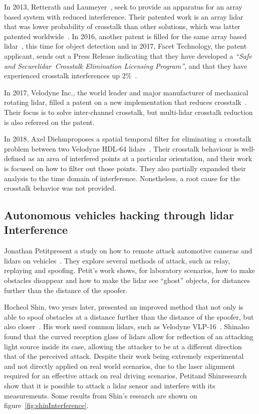 In 2013, Retterath and Laumeyer~\cite{Retterath2015}, seek to provide an apparatus for an array based system with reduced interference. Their patented work is an array \ac{lidar} that was lower probability of crosstalk than other solutions, which was latter patented worldwide~\cite{Retterath2015WO}. In 2016, another patent is filled for the same array based \ac{lidar}~\cite{Retterath2016}, this time for object detection and in 2017, Facet Technology, the patent applicant, sends out a Press Release indicating that they have developed a \textit{``Safe and Secure\acs{lidar}\cp~Crosstalk Elimination Licensing Program''}, and that they have experienced crosstalk interferences up 2\%~\cite{Facet}.

In 2017, Velodyne Inc., the world leader and  major manufacturer of mechanical rotating \ac{lidar}, filled a patent on a new implementation that reduces crosstalk~\cite{Hall2017}. Their focus is to solve inter-channel crosstalk, but multi-\ac{lidar} crosstalk reduction is also referred on the patent.

In 2018, Axel Diehm\etal proposes a spatial temporal filter for eliminating a crosstalk problem between two Velodyne HDL-64 \acp{lidar}~\cite{Hebel2018}. Their crosstalk behaviour is well-defined as an area of interfered points at a particular orientation, and their work is focused on how to filter out those points. They also partially expanded their analysis to the time domain of interference. Nonetheless, a root cause for the crosstalk behavior was not provided.

\subsection{Autonomous vehicles hacking through \ac{lidar} Interference}
Jonathan Petit\etal present a study on how to remote attack automotive cameras and \acp{lidar} on vehicles~\cite{Petit2015}. They explore several methods of attack, such as relay, replaying and spoofing. Petit's work shows, for laboratory scenarios, how to make obstacles disappear and how to make the \ac{lidar} see ``ghost'' objects, for distances further than the distance of the spoofer. 

Hocheol Shin\etal, two years later, presented an improved method that not only is able to spoof obstacles at a distance further than the distance of the spoofer, but also closer~\cite{Shin2017}. His work used common \acp{lidar}, such as Velodyne VLP-16~\cite{vlp16}. Shin\etal also found that the curved reception glass of \acp{lidar} allow for reflection of an attacking light source inside its case, allowing the attacker to be at a different direction that of the perceived attack. Despite their work being extremely experimental and not directly applied on real world scenarios, due to the laser alignment required for an effective attack on real driving scenarios, Petit\etal and Shin\etal research show that it is possible to attack a \ac{lidar} sensor and interfere with its measurements. Some results from Shin's research are shown on figure~\ref{fig:shinInterference}.

